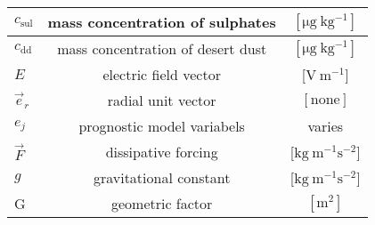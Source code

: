 \begin{longtable}[H]{|l|c|c|}
\hline
$c_{\mathrm{sul}}$ &mass concentration of sulphates &  $ \left[ \mathrm{\mu g \ kg^{-1}} \right] $\\
\hline
$c_{\mathrm{dd}}$ &mass concentration of desert dust &  $ \left[ \mathrm{\mu g \ kg^{-1}} \right] $\\
\hline
$E$ & electric field vector &  [$\mathrm{V \ m^{-1}}$] \\
\hline
$\vec{e}_{r}$ &radial unit vector &  $ [ \mathrm{none}] $\\
\hline
${e}_{j}$ & prognostic model variabels &  varies\\
\hline
$\vec{F}$&dissipative forcing&[$\mathrm{kg \ m^{-1} s^{-2}}$]\\
\hline
$g$&gravitational constant&[$\mathrm{kg \ m^{-1} s^{-2}}$]\\
\hline
G&geometric factor& $ \left[ \mathrm{m^{2}} \right] $\\
\hline


\end{longtable}
